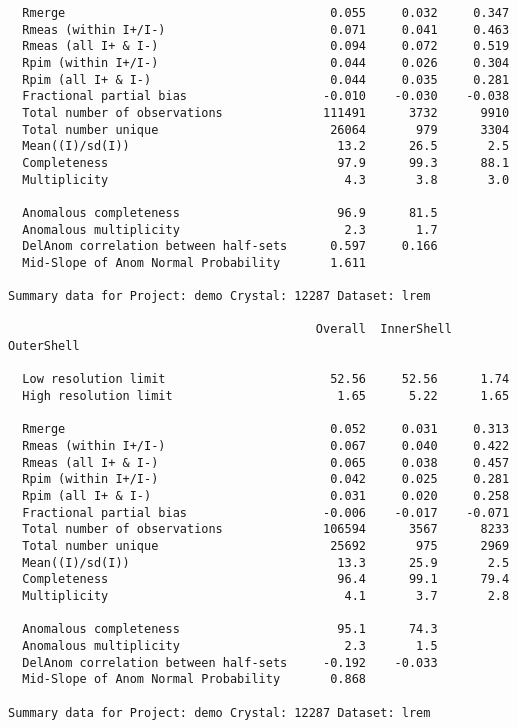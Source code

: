 \documentclass[a4paper, 11pt]{article}
\begin{document}
{\begin{verbatim}
  Rmerge                                     0.055     0.032     0.347
  Rmeas (within I+/I-)                       0.071     0.041     0.463
  Rmeas (all I+ & I-)                        0.094     0.072     0.519
  Rpim (within I+/I-)                        0.044     0.026     0.304
  Rpim (all I+ & I-)                         0.044     0.035     0.281
  Fractional partial bias                   -0.010    -0.030    -0.038
  Total number of observations              111491      3732      9910
  Total number unique                        26064       979      3304
  Mean((I)/sd(I))                             13.2      26.5       2.5
  Completeness                                97.9      99.3      88.1
  Multiplicity                                 4.3       3.8       3.0

  Anomalous completeness                      96.9      81.5
  Anomalous multiplicity                       2.3       1.7
  DelAnom correlation between half-sets      0.597     0.166
  Mid-Slope of Anom Normal Probability       1.611

Summary data for Project: demo Crystal: 12287 Dataset: lrem

                                           Overall  InnerShell OuterShell

  Low resolution limit                       52.56     52.56      1.74
  High resolution limit                       1.65      5.22      1.65

  Rmerge                                     0.052     0.031     0.313
  Rmeas (within I+/I-)                       0.067     0.040     0.422
  Rmeas (all I+ & I-)                        0.065     0.038     0.457
  Rpim (within I+/I-)                        0.042     0.025     0.281
  Rpim (all I+ & I-)                         0.031     0.020     0.258
  Fractional partial bias                   -0.006    -0.017    -0.071
  Total number of observations              106594      3567      8233
  Total number unique                        25692       975      2969
  Mean((I)/sd(I))                             13.3      25.9       2.5
  Completeness                                96.4      99.1      79.4
  Multiplicity                                 4.1       3.7       2.8

  Anomalous completeness                      95.1      74.3
  Anomalous multiplicity                       2.3       1.5
  DelAnom correlation between half-sets     -0.192    -0.033
  Mid-Slope of Anom Normal Probability       0.868

Summary data for Project: demo Crystal: 12287 Dataset: lrem


\end{verbatim}}
\end{document}
